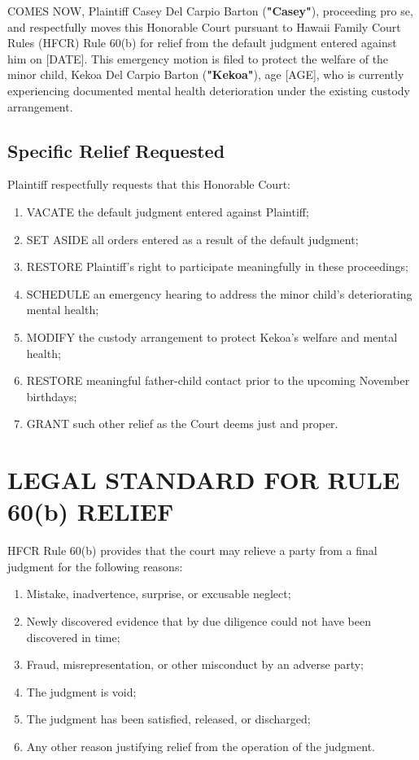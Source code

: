 \documentclass[12pt,letterpaper]{article}
\begin{document}
COMES NOW, Plaintiff Casey Del Carpio Barton (\textbf{"Casey"}), proceeding pro se, and respectfully moves this Honorable Court pursuant to Hawaii Family Court Rules (HFCR) Rule 60(b) for relief from the default judgment entered against him on [DATE]. This emergency motion is filed to protect the welfare of the minor child, Kekoa Del Carpio Barton (\textbf{"Kekoa"}), age [AGE], who is currently experiencing documented mental health deterioration under the existing custody arrangement.

\subsection{Specific Relief Requested}

Plaintiff respectfully requests that this Honorable Court:

\begin{enumerate}
\item VACATE the default judgment entered against Plaintiff;
\item SET ASIDE all orders entered as a result of the default judgment;
\item RESTORE Plaintiff's right to participate meaningfully in these proceedings;
\item SCHEDULE an emergency hearing to address the minor child's deteriorating mental health;
\item MODIFY the custody arrangement to protect Kekoa's welfare and mental health;
\item RESTORE meaningful father-child contact prior to the upcoming November birthdays;
\item GRANT such other relief as the Court deems just and proper.
\end{enumerate}

\section{LEGAL STANDARD FOR RULE 60(b) RELIEF}

HFCR Rule 60(b) provides that the court may relieve a party from a final judgment for the following reasons:

\begin{enumerate}
\item Mistake, inadvertence, surprise, or excusable neglect;
\item Newly discovered evidence that by due diligence could not have been discovered in time;
\item Fraud, misrepresentation, or other misconduct by an adverse party;
\item The judgment is void;
\item The judgment has been satisfied, released, or discharged;
\item Any other reason justifying relief from the operation of the judgment.
\end{enumerate}
\end{document}
